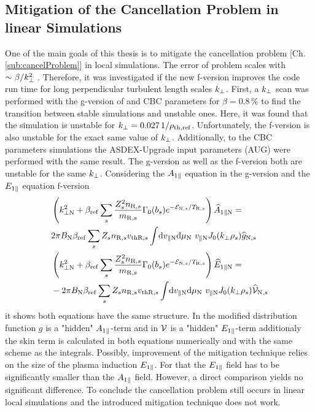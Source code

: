 \subsection{Mitigation of the Cancellation Problem in linear Simulations}
\label{sub:mitigationLinearFVersion}

One of the main goals of this thesis is to mitigate the cancellation problem [Ch. \ref{sub:cancelProblem}] in local simulations. The error of problem scales with $\sim \beta/k_\perp^2$ \cite{Mishchenko2017}. Therefore, it was investigated if the new f-version improves the code run time for long perpendicular turbulent length scales $k_\perp$. First, a $k_\perp$ scan was performed with the g-version of {\gkw} and CBC parameters for $\beta = 0.8\,\%$ to find the transition between stable simulations and unstable ones. Here, it was found that the simulation is unstable for $k_\perp = 0.027\,1/\rho_{\mathrm{th},\mathrm{ref}}$. Unfortunately, the f-version is also unstable for the exact same value of $k_\perp$. Additionally, to the CBC parameters simulations the ASDEX-Upgrade input parameters (AUG) were performed with the same result. The g-version as well as the f-version both are unstable for the same $k_\perp$. Considering the $A_{1\parallel}$ equation in the g-version and the $E_{1\parallel}$ equation f-version
\begin{gather}
    \begin{aligned}
        &\left(k_{\perp \mathrm{N}}^2 + \beta_\mathrm{ref} \sum_s \frac{Z^2_sn_{\mathrm{R},s}}{m_{\mathrm{R},s}} \Gamma_0(b_s) e^{-\mathcal{E}_{\mathrm{N},s}/T_{\mathrm{R},s}} \right) \widehat{A}_{1\parallel \mathrm{N}} = \\
        & 2\pi B_\mathrm{N} \beta_\mathrm{ref} \sum_s Z_s n_{\mathrm{R},s} v_{\mathrm{th}\mathrm{R},s} \int \! \mathrm{d}v_{\parallel \mathrm{N}} \mathrm{d}\mu_\mathrm{N} ~ v_{\parallel \mathrm{N}} J_0(k_\perp \rho_s) \widehat{g}_{\mathrm{N},s}\\
        &\left(k_{\perp \mathrm{N}}^2 + \beta_\mathrm{ref} \sum_s \frac{Z^2_sn_{\mathrm{R},s}}{m_{\mathrm{R},s}} \Gamma_0(b_s) e^{-\mathcal{E}_{\mathrm{N},s}/T_{\mathrm{R},s}} \right) \widehat{E}_{1\parallel \mathrm{N}} = \\
        &- 2\pi B_\mathrm{N} \beta_\mathrm{ref} \sum_s Z_s n_{\mathrm{R},s} v_{\mathrm{th}\mathrm{R},s} \int \! \mathrm{d}v_{\parallel \mathrm{N}} \mathrm{d}\mu_\mathrm{N} ~ v_{\parallel \mathrm{N}} J_0(k_\perp \rho_s) \widehat{\mathcal{V}}_{\mathrm{N},s}
    \end{aligned}
    \label{eq:compareAparEpar}
\end{gather}
it shows both equations have the same structure. In the modified distribution function $g$ is a "hidden" $A_{1\parallel}$-term and in $\mathcal{V}$ is a "hidden" $E_{1\parallel}$-term additionaly the skin term is calculated in both equations numerically and with the same scheme as the integrals. Possibly, improvement of the mitigation technique relies on the size of the plasma induction $E_{1\parallel}$. For that the $E_{1\parallel}$ field has to be significantly smaller than the $A_{1\parallel}$ field. However, a direct comparison yields no significant difference. To conclude the cancellation problem still occurs in linear local simulations and the introduced mitigation technique does not work. 

